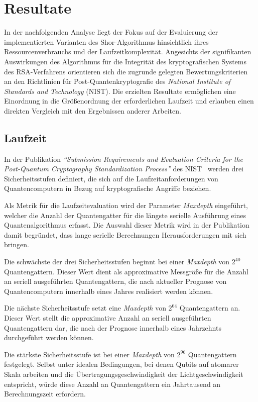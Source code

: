 \section{Resultate}
In der nachfolgenden Analyse liegt der Fokus auf der Evaluierung der implementierten Varianten des Shor-Algorithmus hinsichtlich ihres Ressourcenverbrauchs und 
der Laufzeitkomplexität. 
Angesichts der signifikanten Auswirkungen des Algorithmus für die Integrität des kryptografischen Systems des RSA-Verfahrens  
orientieren sich die zugrunde gelegten Bewertungskriterien an den Richtlinien für Post-Quantenkryptografie des \textit{National Institute of Standards and Technology} (NIST). 
Die erzielten Resultate ermöglichen eine Einordnung in die Größenordnung der erforderlichen Laufzeit und 
erlauben einen direkten Vergleich mit den Ergebnissen anderer Arbeiten.

\subsection*{Laufzeit}
In der Publikation \textit{"`Submission Requirements and Evaluation Criteria for the Post-Quantum Cryptography Standardization Process"'} des NIST~\cite[17]{NISTPQC} 
werden drei Sicherheitsstufen definiert, die sich auf die Laufzeitanforderungen von Quantencomputern in Bezug auf kryptografische Angriffe beziehen.

Als Metrik für die Laufzeitevaluation wird der Parameter \textit{Maxdepth} eingeführt, 
welcher die Anzahl der Quantengatter für die längste serielle Ausführung eines Quantenalgorithmus erfasst.
Die Auswahl dieser Metrik wird in der Publikation damit begründet, dass lange serielle Berechnungen Herausforderungen mit sich bringen.

Die schwächste der drei Sicherheitsstufen beginnt bei einer \textit{Maxdepth} von \(2^{40}\) Quantengattern. 
Dieser Wert dient als approximative Messgröße für die Anzahl an seriell ausgeführten Quantengattern, 
die nach aktueller Prognose von Quantencomputern innerhalb eines Jahres realisiert werden können.

Die nächste Sicherheitsstufe setzt eine \textit{Maxdepth} von \(2^{64}\) Quantengattern an.
Dieser Wert stellt die approximative Anzahl an seriell ausgeführten Quantengattern dar, 
die nach der Prognose innerhalb eines Jahrzehnts durchgeführt werden können.

Die stärkste Sicherheitsstufe ist bei einer \textit{Maxdepth} von \(2^{96}\) Quantengattern festgelegt. 
Selbst unter idealen Bedingungen, 
bei denen Qubits auf atomarer Skala arbeiten und die Übertragungsgeschwindigkeit der Lichtgeschwindigkeit entspricht, 
würde diese Anzahl an Quantengattern ein Jahrtausend an Berechnungszeit erfordern.


